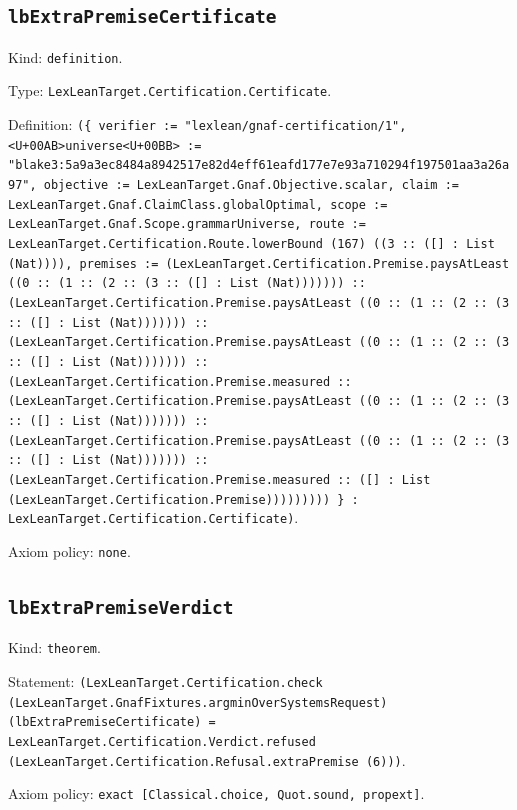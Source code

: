 \documentclass[11pt]{article}
\begin{document}
\subsection*{\texttt{lbExtraPremiseCertificate}}
\noindent Kind: \texttt{definition}.\par
\noindent Type: \texttt{LexLeanTarget.Certification.Certificate}.\par
\noindent Definition: \texttt{(\{ verifier := "lexlean/gnaf-certification/1", <U+00AB>universe<U+00BB> := "blake3:5a9a3ec8484a8942517e82d4eff61eafd177e7e93a710294f197501aa3a26a97", objective := LexLeanTarget.Gnaf.Objective.scalar, claim := LexLeanTarget.Gnaf.ClaimClass.globalOptimal, scope := LexLeanTarget.Gnaf.Scope.grammarUniverse, route := LexLeanTarget.Certification.Route.lowerBound (167) ((3 :: ([] : List (Nat)))), premises := (LexLeanTarget.Certification.Premise.paysAtLeast ((0 :: (1 :: (2 :: (3 :: ([] : List (Nat))))))) :: (LexLeanTarget.Certification.Premise.paysAtLeast ((0 :: (1 :: (2 :: (3 :: ([] : List (Nat))))))) :: (LexLeanTarget.Certification.Premise.paysAtLeast ((0 :: (1 :: (2 :: (3 :: ([] : List (Nat))))))) :: (LexLeanTarget.Certification.Premise.measured :: (LexLeanTarget.Certification.Premise.paysAtLeast ((0 :: (1 :: (2 :: (3 :: ([] : List (Nat))))))) :: (LexLeanTarget.Certification.Premise.paysAtLeast ((0 :: (1 :: (2 :: (3 :: ([] : List (Nat))))))) :: (LexLeanTarget.Certification.Premise.measured :: ([] : List (LexLeanTarget.Certification.Premise))))))))) \} : LexLeanTarget.Certification.Certificate)}.\par
\noindent Axiom policy: \texttt{none}.\par
\subsection*{\texttt{lbExtraPremiseVerdict}}
\noindent Kind: \texttt{theorem}.\par
\noindent Statement: \texttt{(LexLeanTarget.Certification.check (LexLeanTarget.GnafFixtures.argminOverSystemsRequest) (lbExtraPremiseCertificate) = LexLeanTarget.Certification.Verdict.refused (LexLeanTarget.Certification.Refusal.extraPremise (6)))}.\par
\noindent Axiom policy: \texttt{exact [Classical.choice, Quot.sound, propext]}.\par
\end{document}
